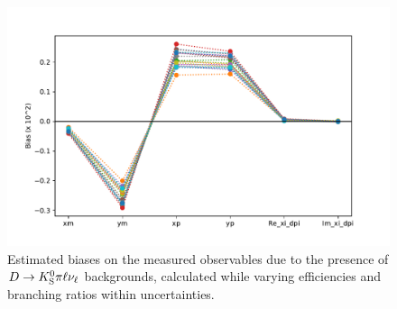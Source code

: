 
\begin{figure}[tb]
    \centering
    \includegraphics[width=0.65\columnwidth]{figures/analysis/semileptonic_bkgs/D2Kstmunu_biases.pdf}
    \caption{Estimated biases on the measured observables due to the presence of ${D}\rightarrow{\ensuremath{{K}^0_{\mathrm{S}}}}\pi\ell\nu_\ell$ backgrounds, calculated while varying efficiencies and branching ratios within uncertainties.}
    \label{fig:d2kstmunu_biases}
\end{figure}

